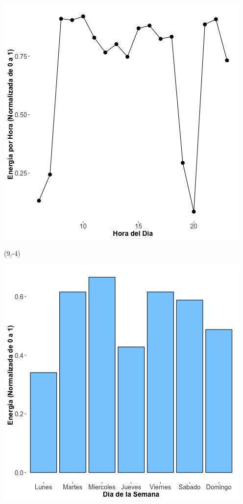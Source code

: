 \documentclass{article}\usepackage[]{graphicx}\usepackage[]{color}
\newenvironment{knitrout}{}{} %
\begin{document}
\begin{knitrout}
\color{fgcolor}
\includegraphics[scale=0.65]{figure/A21_plot_norm_median} 
\end{knitrout}


 \begin{textblock}{1}(9,-4)
\begin{minipage}{20em}
\begingroup

\endgroup
\end{minipage}
\end{textblock}


\begin{knitrout}
\color{fgcolor}
\includegraphics[scale=0.65]{figure/A21_day_of_week_plot} 
\end{knitrout}
\end{document}

